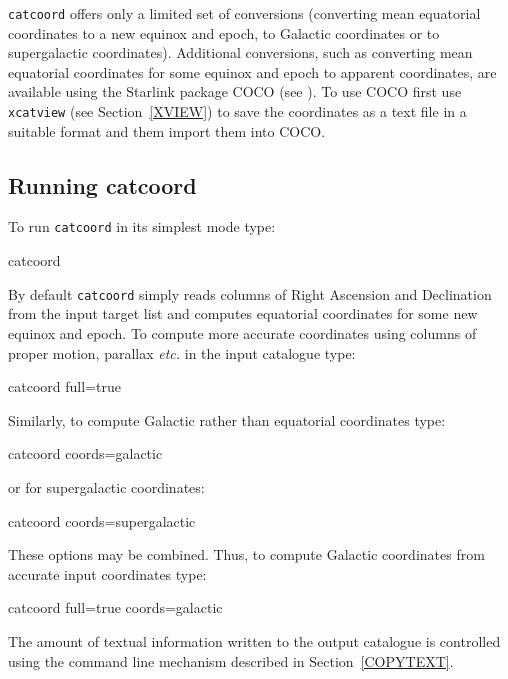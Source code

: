 \documentclass[twoside,11pt]{starlink}
\begin{document}
\texttt{catcoord} offers only a limited set of conversions (converting
mean equatorial coordinates to a new equinox and epoch, to Galactic
coordinates or to supergalactic coordinates).  Additional conversions,
such as converting mean equatorial coordinates for some equinox and epoch
to apparent coordinates, are available using the Starlink package COCO (see
\cite{SUN56}).  To use COCO first use \texttt{xcatview}
(see Section~\ref{XVIEW}) to save the coordinates as a text file in a
suitable format and them import them into COCO.

\subsection{Running catcoord}

To run \texttt{catcoord} in its simplest mode type:

\begin{terminalv}
catcoord
\end{terminalv}

By default \texttt{catcoord} simply reads columns of Right Ascension and
Declination from the input target list and computes equatorial
coordinates for some new equinox and epoch.  To compute more accurate
coordinates using columns of proper motion, parallax \emph{etc.} in the
input catalogue type:

\begin{terminalv}
catcoord full=true
\end{terminalv}

Similarly, to compute Galactic rather than equatorial coordinates type:

\begin{terminalv}
catcoord  coords=galactic
\end{terminalv}

or for supergalactic coordinates:

\begin{terminalv}
catcoord  coords=supergalactic
\end{terminalv}

These options may be combined.  Thus, to compute Galactic coordinates
from accurate input coordinates type:

\begin{terminalv}
catcoord  full=true  coords=galactic
\end{terminalv}

The amount of textual information written to the output catalogue is
controlled using the command line mechanism described in
Section~\ref{COPYTEXT}.
\end{document}
